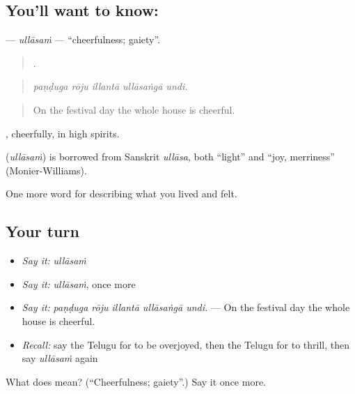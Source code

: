 \subsection*{You'll want to know: }
\textbf{} — \emph{ullāsaṁ} — \textquotedblleft{}cheerfulness; gaiety\textquotedblright{}.

\begin{quote}
    .
\end{quote}

\begin{quote}
\emph{paṇḍuga rōju illantā ullāsaṅgā undi.}
\end{quote}

\begin{quote}
On the festival day the whole house is cheerful.
\end{quote}

, cheerfully, in high spirits.

\begin{cousinweb}
\textbf{} (\emph{ullāsaṁ}) is borrowed from Sanskrit \emph{ullāsa}, both \textquotedblleft{}light\textquotedblright{} and \textquotedblleft{}joy, merriness\textquotedblright{} (Monier-Williams).
\end{cousinweb}

\begin{grammarlens}[title={What you've built}]
One more word for describing what you lived and felt.
\end{grammarlens}

\subsection*{Your turn}
\begin{itemize}
\raggedright
  \item \emph{Say it:} \emph{ullāsaṁ}
  \item \emph{Say it:} \emph{ullāsaṁ}, once more
  \item \emph{Say it:} \emph{paṇḍuga rōju illantā ullāsaṅgā undi.} — On the festival day the whole house is cheerful.
  \item \emph{Recall:} say the Telugu for to be overjoyed, then the Telugu for to thrill, then say \emph{ullāsaṁ} again
\end{itemize}

\begin{tcolorbox}[breakable,colback=teal!4,colframe=teal!35!black,title={Before you move on}]
What does  mean? (\textquotedblleft{}Cheerfulness; gaiety\textquotedblright{}.) Say it once more.
\end{tcolorbox}
